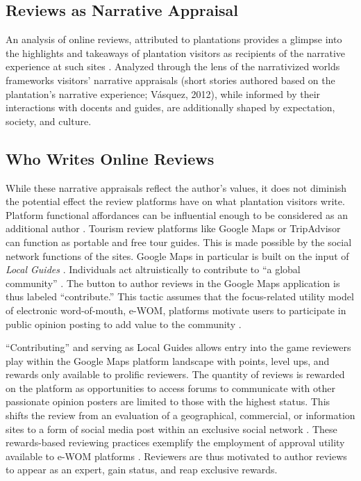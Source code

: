 \documentclass[final]{anthology-ch} %
\begin{document}
\subsection{Reviews as Narrative Appraisal}

An analysis of online reviews, attributed to plantations provides a glimpse into the highlights and takeaways of plantation visitors as recipients of the narrative experience at such sites \cite{alderman2016political}. Analyzed through the lens of the narrativized worlds frameworks visitors' narrative appraisals (short stories authored based on the plantation's narrative experience; Vásquez, 2012), while informed by their interactions with docents and guides, are additionally shaped by expectation, society, and culture.

\subsection{Who Writes Online Reviews}

While these narrative appraisals reflect the author's values, it does not diminish the potential effect the review platforms have on what plantation visitors write. Platform functional affordances can be influential enough to be considered as an additional author \cite{ruytenbeek2021exploring}. Tourism review platforms like Google Maps or TripAdvisor can function as portable and free tour guides. This is made possible by the social network functions of the sites. Google Maps in particular is built on the input of \textit{Local Guides} \cite{schaik2019playful}. Individuals act altruistically to contribute to \enquote{a global community} \cite{localguides}. The button to author reviews in the Google Maps application is thus labeled \enquote{contribute.} This tactic assumes that the focus-related utility model of electronic word-of-mouth, e-WOM, platforms motivate users to participate in public opinion posting to add value to the community \cite{hennigthurau2004electronic}.

\enquote{Contributing} and serving as Local Guides allows entry into the game reviewers play within the Google Maps platform landscape with points, level ups, and rewards only available to prolific reviewers. The quantity of reviews is rewarded on the platform as opportunities to access forums to communicate with other passionate opinion posters are limited to those with the highest status. This shifts the review from an evaluation of a geographical, commercial, or information sites to a form of social media post within an exclusive social network \cite{schaik2019playful}. These rewards-based reviewing practices exemplify the employment of approval utility available to e-WOM platforms \cite{hennigthurau2004electronic}. Reviewers are thus motivated to author reviews to appear as an expert, gain status, and reap exclusive rewards.
\end{document}
